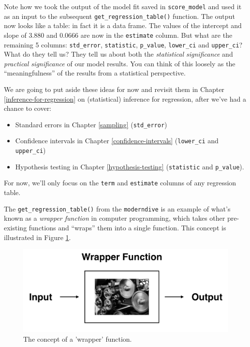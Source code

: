 \documentclass[12pt, krantz2,]{krantz}
\providecommand{\tightlist}{%
  \setlength{\itemsep}{0pt}\setlength{\parskip}{0pt}}
\begin{document}
Note how we took the output of the model fit saved in \texttt{score\_model} and used it as an input to the subsequent \texttt{get\_regression\_table()} function. The output now looks like a table: in fact it is a data frame. The values of the intercept and slope of 3.880 and 0.0666 are now in the \texttt{estimate} column. But what are the remaining 5 columns: \texttt{std\_error}, \texttt{statistic}, \texttt{p\_value}, \texttt{lower\_ci} and \texttt{upper\_ci}? What do they tell us? They tell us about both the \emph{statistical significance} and \emph{practical significance} of our model results. You can think of this loosely as the ``meaningfulness'' of the results from a statistical perspective.

We are going to put aside these ideas for now and revisit them in Chapter \ref{inference-for-regression} on (statistical) inference for regression, after we've had a chance to cover:

\begin{itemize}
\tightlist
\item
  Standard errors in Chapter \ref{sampling} (\texttt{std\_error})
\item
  Confidence intervals in Chapter \ref{confidence-intervals} (\texttt{lower\_ci} and \texttt{upper\_ci})
\item
  Hypothesis testing in Chapter \ref{hypothesis-testing} (\texttt{statistic} and \texttt{p\_value}).
\end{itemize}

For now, we'll only focus on the \texttt{term} and \texttt{estimate} columns of any regression table.

The \texttt{get\_regression\_table()} from the \texttt{moderndive} is an example of what's known as a \emph{wrapper function} in computer programming, which takes other pre-existing functions and ``wraps'' them into a single function. This concept is illustrated in Figure \ref{fig:moderndive-figure-wrapper}.

\begin{figure}

{\centering \includegraphics[width=\textwidth]{images/flowcharts/flowchart.011-cropped} 

}

\caption{The concept of a 'wrapper' function.}\label{fig:moderndive-figure-wrapper}
\end{figure}
\end{document}
